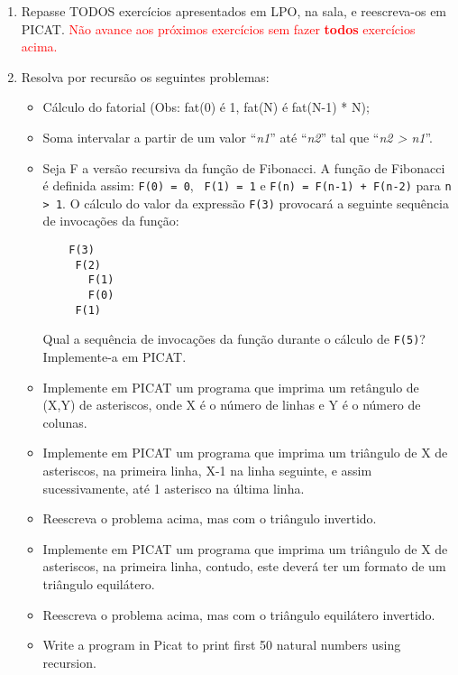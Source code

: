 \documentclass[12pt,a4paper]{article}
\begin{document}
\begin{enumerate}
\item Repasse TODOS exercícios apresentados em LPO, na sala, e 
reescreva-os em PICAT. \textcolor{red}{Não avance aos próximos exercícios sem fazer \textbf{todos} exercícios acima.}
 



\item Resolva por recursão os seguintes problemas:
\begin{itemize}

\item Cálculo do fatorial (Obs: fat(0) é 1, fat(N) é fat(N-1) * N);

\item Soma intervalar a partir de um valor\/ ``{\em n1}''\/ até\/ ``{\em n2}''\/  tal que\/ ``{\em n2 > n1}''\/.

\item Seja F a versão recursiva da função de Fibonacci.  A função de Fibonacci é definida assim:  
 \texttt{F(0) = 0}, \texttt{ F(1) = 1}   e   \texttt{F(n) = F(n-1) + F(n-2)}   para 
 \texttt{n > 1}.  O cálculo do valor da expressão \texttt{F(3)} provocará a seguinte sequência de invocações da função:
\begin{verbatim}
    F(3)
     F(2)
       F(1)
       F(0)
     F(1)
 \end{verbatim}
  Qual a sequência de invocações da função durante o cálculo de \texttt{F(5)}?
  Implemente-a em PICAT.


\item Implemente em PICAT um programa que imprima um retângulo de (X,Y) de asteriscos,
onde X é o número de linhas e Y é o número de colunas.


\item Implemente em PICAT um programa que imprima um triângulo de X de asteriscos, na primeira linha,
X-1 na linha seguinte, e assim sucessivamente, até 1 asterisco na última linha.

\item Reescreva o problema acima, mas com o triângulo 
invertido.


\item  Implemente em PICAT um programa que imprima um triângulo de X de asteriscos, na primeira linha,
contudo, este deverá ter um formato de um triângulo
equilátero.

\item Reescreva o problema acima, mas com o triângulo 
equilátero invertido.


\item Write a program in Picat to print first 50 natural numbers using recursion.


\end{itemize}
\end{enumerate}
\end{document}
